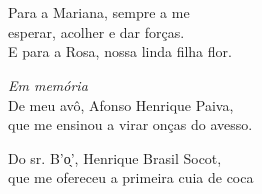 



\chapter*{}
\thispagestyle{empty}

\vfill
\begin{flushright}
\small
Para a Mariana, sempre a me\\
esperar, acolher e dar forças.\\
E para a Rosa, nossa linda filha flor.

\bigskip

\textit{Em memória}\\
De meu avô, Afonso Henrique Paiva,\\
que me ensinou a virar onças do avesso.

\smallskip

Do sr. B'o̖', Henrique Brasil Socot,\\
que me ofereceu a primeira cuia de coca
\end{flushright}